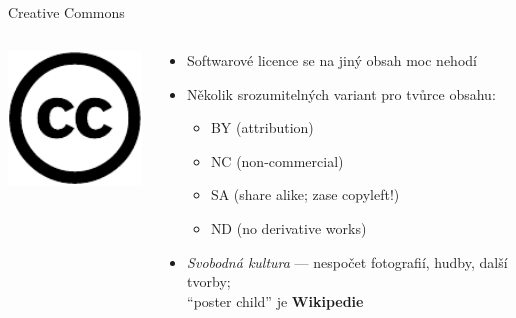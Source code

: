 \documentclass{beamer}
\begin{document}
\subsection{}
\begin{frame}{Creative Commons}
\begin{columns}
\begin{column}{4cm}
\includegraphics[width=4cm]{cc.pdf}
\end{column}
\begin{column}{7cm}
\begin{itemize}
\item Softwarové licence se na jiný obsah moc nehodí
\item Několik srozumitelných variant pro tvůrce obsahu:
\begin{itemize}
\item BY (attribution)
\item NC (non-commercial)
\item SA (share alike; zase copyleft!)
\item ND (no derivative works)
\end{itemize}
\item {\em Svobodná kultura} --- nespočet fotografií, hudby, další tvorby;\\``poster child'' je {\bf Wikipedie}
\end{itemize}
\end{column}
\end{columns}
\end{frame}
\end{document}
